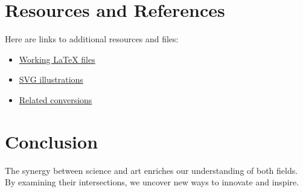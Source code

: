 \section{Resources and References}
Here are links to additional resources and files:
\begin{itemize}
    \item \href{./workingish\ latex}{Working LaTeX files}
    \item \href{./svgs}{SVG illustrations}
    \item \href{./dconv}{Related conversions}
\end{itemize}

\section{Conclusion}
The synergy between science and art enriches our understanding of both fields. By examining their intersections, we uncover new ways to innovate and inspire.


